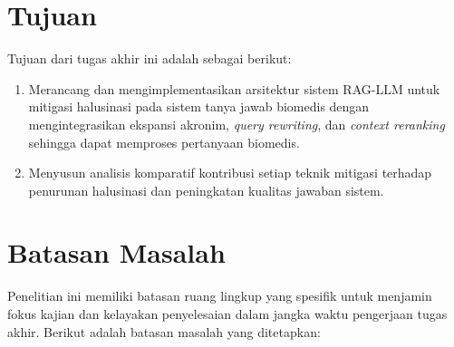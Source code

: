 \section{Tujuan}

Tujuan dari tugas akhir ini adalah sebagai berikut:
\begin{enumerate}
    \item Merancang dan mengimplementasikan arsitektur sistem RAG-LLM untuk mitigasi halusinasi pada sistem tanya jawab biomedis dengan mengintegrasikan ekspansi akronim, \textit{query rewriting}, dan \textit{context reranking} sehingga dapat memproses pertanyaan biomedis.
    \item Menyusun analisis komparatif kontribusi setiap teknik mitigasi terhadap penurunan halusinasi dan peningkatan kualitas jawaban sistem.
\end{enumerate}

\section{Batasan Masalah}

Penelitian ini memiliki batasan ruang lingkup yang spesifik untuk
menjamin fokus kajian dan kelayakan penyelesaian dalam jangka waktu
pengerjaan tugas akhir. Berikut adalah batasan masalah yang ditetapkan:

